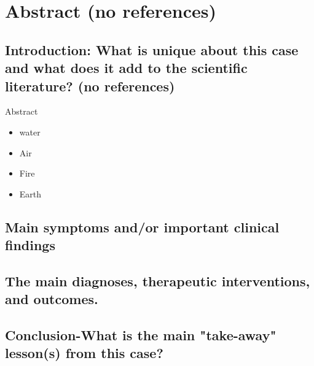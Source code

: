 \section{ Abstract (no references)}

\subsection{Introduction: What is unique about this case and what does it add to the scientific literature? (no references)}
\begin{frame}{Abstract}
    \begin{itemize}
        \item water 
        \item Air 
        \item Fire 
        \item Earth 
    \end{itemize}
\end{frame}

\subsection{Main symptoms and/or important clinical findings}


\subsection{The main diagnoses, therapeutic interventions, and outcomes.}


\subsection{Conclusion-What is the main "take-away" lesson(s) from this case?}